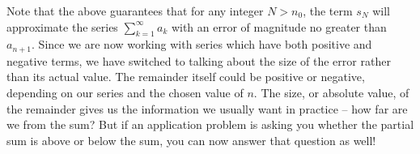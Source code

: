 \documentclass{ximera}
\begin{document}
\begin{remark}
Note that the above guarantees that for any integer $N>n_0$, the term $s_N$ will approximate the series $\sum_{k=1}^{\infty} a_k$ with an error of magnitude no greater than $a_{n+1}$.  Since we are now working with series which have both positive and negative terms, we have switched to talking about the size of the error rather than its actual value.  The remainder itself could be positive or negative, depending on our series and the chosen value of $n$.  The size, or absolute value, of the remainder gives us the information we usually want in practice -- how far are we from the sum?  But if an application problem is asking you whether the partial sum is above or below the sum, you can now answer that question as well!
\end{remark}
\end{document}
